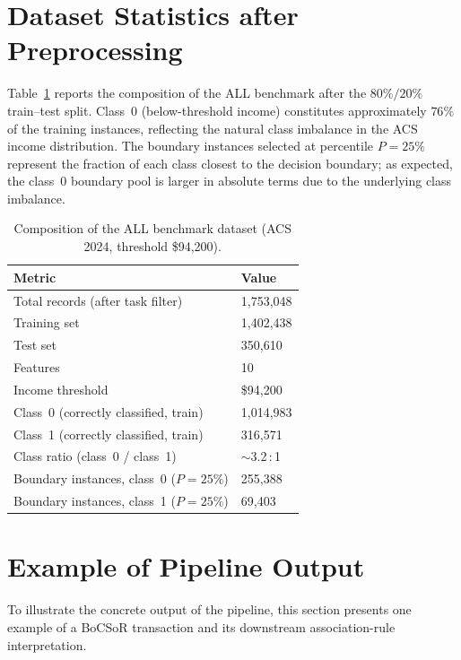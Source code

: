 \section{Dataset Statistics after Preprocessing}
\label{app:dataset-stats}

Table~\ref{tab:dataset-stats} reports the composition of the ALL benchmark after the $80\%/20\%$ train--test split. Class~0 (below-threshold income) constitutes approximately $76\%$ of the training instances, reflecting the natural class imbalance in the ACS income distribution. The boundary instances selected at percentile $P = 25\%$ represent the fraction of each class closest to the decision boundary; as expected, the class~0 boundary pool is larger in absolute terms due to the underlying class imbalance.

\begin{table}[htbp]
\centering
\renewcommand{\arraystretch}{1.2}
\caption{Composition of the ALL benchmark dataset (ACS 2024, threshold \$94,200).}
\label{tab:dataset-stats}
\begin{tabular}{>{\raggedright\arraybackslash}p{} p{}}
  \toprule
  \textbf{Metric} & \textbf{Value} \\
  \midrule
  Total records (after task filter) & 1,753,048 \\
  Training set & 1,402,438 \\
  Test set & 350,610 \\
  Features & 10 \\
  Income threshold & \$94,200 \\
  \midrule
  Class~0 (correctly classified, train) & 1,014,983 \\
  Class~1 (correctly classified, train) & 316,571 \\
  Class ratio (class~0 / class~1) & $\sim$3.2\,:\,1 \\
  \midrule
  Boundary instances, class~0 ($P = 25\%$) & 255,388 \\
  Boundary instances, class~1 ($P = 25\%$) & 69,403 \\
  \bottomrule
\end{tabular}
\renewcommand{\arraystretch}{1.0}
\end{table}

\section{Example of Pipeline Output}
\label{app:example-output}

To illustrate the concrete output of the pipeline, this section presents one example of a BoCSoR transaction and its downstream association-rule interpretation.

